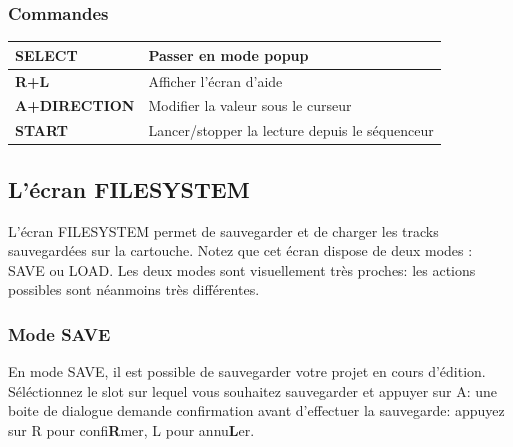 \documentclass[12pt,a4paper]{article}
\begin{document}
        \subsubsection{Commandes}        
        \tablelasttail{\hline}
        \begin{supertabular}{|l|p{11cm}|}
        \hline
            {\bf SELECT} & Passer en mode popup \\
            \hline
            {\bf R+L} & Afficher l'écran d'aide \\
            \hline
            {\bf A+DIRECTION} & Modifier la valeur sous le curseur \\
            \hline
            {\bf START} & Lancer/stopper la lecture depuis le séquenceur \\ 
        \hline
        \end{supertabular}
    
    \subsection{L'écran FILESYSTEM}\label{filesystem}
    
    L'écran FILESYSTEM permet de sauvegarder et de charger les tracks sauvegardées sur la cartouche. Notez que cet écran dispose de deux modes : SAVE ou LOAD. Les deux modes sont visuellement très proches: les actions possibles sont néanmoins très différentes.
    
        \subsubsection{Mode SAVE}
        
        En mode SAVE, il est possible de sauvegarder votre projet en cours d'édition. Séléctionnez le slot sur lequel vous souhaitez sauvegarder et appuyer sur A: une boite de dialogue demande confirmation avant d'effectuer la sauvegarde: appuyez sur R pour confi{\bf R}mer, L pour annu{\bf L}er.
        
        
        
\end{document}
